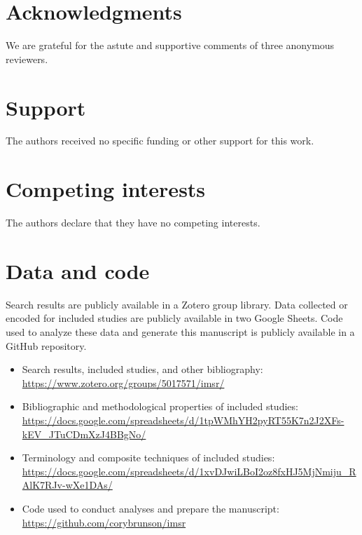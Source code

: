 \documentclass[preprint, 3p,
authoryear]{elsarticle} %
\providecommand{\tightlist}{%
  \setlength{\itemsep}{0pt}\setlength{\parskip}{0pt}}
\begin{document}
\hypertarget{acknowledgments}{%
\section{Acknowledgments}\label{acknowledgments}}

We are grateful for the astute and supportive comments of three
anonymous reviewers.

\hypertarget{support}{%
\section{Support}\label{support}}

The authors received no specific funding or other support for this work.

\hypertarget{competing-interests}{%
\section{Competing interests}\label{competing-interests}}

The authors declare that they have no competing interests.

\hypertarget{data-and-code}{%
\section{Data and code}\label{data-and-code}}

Search results are publicly available in a Zotero group library. Data
collected or encoded for included studies are publicly available in two
Google Sheets. Code used to analyze these data and generate this
manuscript is publicly available in a GitHub repository.

\begin{itemize}
\tightlist
\item
  Search results, included studies, and other bibliography:
  \url{https://www.zotero.org/groups/5017571/imsr/}
\item
  Bibliographic and methodological properties of included studies:
  \url{https://docs.google.com/spreadsheets/d/1tpWMhYH2pyRT55K7n2J2XFs-kEV_JTuCDmXzJ4BBgNo/}
\item
  Terminology and composite techniques of included studies:
  \url{https://docs.google.com/spreadsheets/d/1xvDJwiLBoI2oz8fxHJ5MjNmiju_RAlK7RJv-wXe1DAs/}
\item
  Code used to conduct analyses and prepare the manuscript:
  \url{https://github.com/corybrunson/imsr}
\end{itemize}
\end{document}
